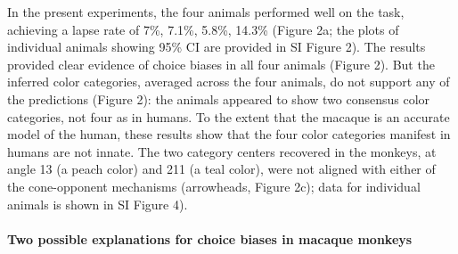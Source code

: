 In the present experiments, the four animals performed well on the task, achieving a lapse rate of 7\%, 7.1\%, 5.8\%, 14.3\% (Figure 2a; the plots of individual animals showing 95\% CI are provided in SI Figure 2).
The results provided clear evidence of choice biases in all four animals (Figure 2).
But the inferred color categories, averaged across the four animals, do not support any of the predictions (Figure 2): the animals appeared to show two consensus color categories, not four as in humans. 
To the extent that the macaque is an accurate model of the human, these results show that the four color categories manifest in humans are not innate. 
The two category centers recovered in the monkeys, at angle 13 (a peach color) and 211 (a teal color), were not aligned with either of the cone-opponent mechanisms (arrowheads, Figure 2c); data for individual animals is shown in SI Figure 4).

\paragraph{Two possible explanations for choice biases in macaque monkeys}

